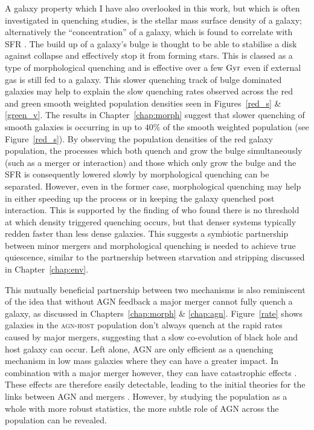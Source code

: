 A galaxy property which I have also overlooked in this work, but which is often investigated in quenching studies, is the stellar mass surface density of a galaxy; alternatively the ``concentration'' of a galaxy, which is found to correlate with SFR \citep{barro13b, whitaker16}. The build up of a galaxy's bulge is thought to be able to stabilise a disk against collapse and effectively stop it from forming stars. This is classed as a type of morphological quenching and is effective over a few $\rm{Gyr}$ \citep{Fang13} even if external gas is still fed to a galaxy. This slower quenching track of bulge dominated galaxies may help to explain the slow quenching rates observed across the red and green smooth weighted population densities seen in Figures~\ref{red_s} \& \ref{green_v}. The results in Chapter~\ref{chap:morph} suggest that slower quenching of smooth galaxies is occurring in up to $40\%$ of the smooth weighted population (see Figure~\ref{red_s}). By observing the population densities of the red galaxy population, the processes which both quench and grow the bulge simultaneously (such as a merger or interaction) and those which only grow the bulge and the SFR is consequently lowered slowly by morphological quenching can be separated. However, even in the former case, morphological quenching may help in either speeding up the process or in keeping the galaxy quenched post interaction. This is supported by the finding of \cite{abramson16} who found there is no threshold at which density triggered quenching occurs, but that denser systems typically redden faster than less dense galaxies. This suggests a symbiotic partnership between minor mergers and morphological quenching is needed to achieve true quiescence, similar to the partnership between starvation and stripping discussed in Chapter~\ref{chap:env}. 

This mutually beneficial partnership between two mechanisms is also reminiscent of the idea that without AGN feedback a major merger cannot fully quench a galaxy, as discussed in Chapters~\ref{chap:morph} \& \ref{chap:agn}. Figure~\ref{rate} shows galaxies in the \textsc{agn-host} population don't always quench at the rapid rates caused by major mergers, suggesting that a slow co-evolution of black hole and host galaxy can occur. Left alone, AGN are only efficient as a quenching mechanism in low mass galaxies where they can have a greater impact. In combination with a major merger however, they can have catastrophic effects \citep{conselice03, springel05b, hopkins08a}. These effects are therefore easily detectable, leading to the initial theories for the links between AGN and mergers \citep{merritt01, hopkins06b, hopkins08a, hopkins08b, peng07, jahnke11}. However, by studying the population as a whole with more robust statistics, the more subtle role of AGN across the population can be revealed. 

